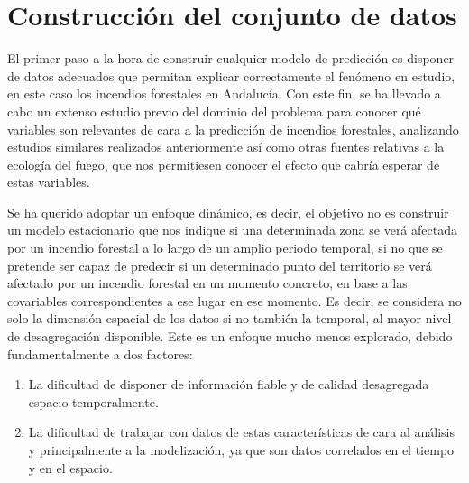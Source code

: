 \documentclass[12pt,a4paper,]{book}
\title{}
\author{Nombre Completo Autor}
\date{18/11/2021}
\def\ifdoblecara{} %
\def\ifprincipal{} %
\let\ifprincipal\undefined %
\providecommand{\tightlist}{%
  \setlength{\itemsep}{0pt}\setlength{\parskip}{0pt}}
\numberwithin{dummy}{section}
\theoremstyle{ocrenumbox}
\theoremstyle{blacknumex}
\theoremstyle{blacknumbox}
\theoremstyle{ocrenum}
\theoremstyle{ocrenum}
\begin{document}




\raggedbottom

\ifdefined\ifprincipal
\else
\setlength{\parindent}{1em}
\pagestyle{fancy}
\setcounter{tocdepth}{4}
\tableofcontents

\fi

\ifdefined\ifdoblecara
\fancyhead{}{}
\fancyhead[LE,RO]{\scriptsize\rightmark}
\fancyfoot[LO,RE]{\scriptsize\slshape \leftmark}
\fancyfoot[C]{}
\fancyfoot[LE,RO]{\footnotesize\thepage}
\else
\fancyhead{}{}
\fancyhead[RO]{\scriptsize\rightmark}
\fancyfoot[LO]{\scriptsize\slshape \leftmark}
\fancyfoot[C]{}
\fancyfoot[RO]{\footnotesize\thepage}
\fi

\renewcommand{\headrulewidth}{0.4pt}
\renewcommand{\footrulewidth}{0.4pt}

\hypertarget{construcciuxf3n-del-conjunto-de-datos}{%
\chapter{Construcción del conjunto de
datos}\label{construcciuxf3n-del-conjunto-de-datos}}

El primer paso a la hora de construir cualquier modelo de predicción es
disponer de datos adecuados que permitan explicar correctamente el
fenómeno en estudio, en este caso los incendios forestales en Andalucía.
Con este fin, se ha llevado a cabo un extenso estudio previo del dominio
del problema para conocer qué variables son relevantes de cara a la
predicción de incendios forestales, analizando estudios similares
realizados anteriormente así como otras fuentes relativas a la ecología
del fuego, que nos permitiesen conocer el efecto que cabría esperar de
estas variables.

Se ha querido adoptar un enfoque dinámico, es decir, el objetivo no es
construir un modelo estacionario que nos indique si una determinada zona
se verá afectada por un incendio forestal a lo largo de un amplio
periodo temporal, si no que se pretende ser capaz de predecir si un
determinado punto del territorio se verá afectado por un incendio
forestal en un momento concreto, en base a las covariables
correspondientes a ese lugar en ese momento. Es decir, se considera no
solo la dimensión espacial de los datos si no también la temporal, al
mayor nivel de desagregación disponible. Este es un enfoque mucho menos
explorado, debido fundamentalmente a dos factores:

\begin{enumerate}
\def\labelenumi{\arabic{enumi}.}
\tightlist
\item
  La dificultad de disponer de información fiable y de calidad
  desagregada espacio-temporalmente.
\item
  La dificultad de trabajar con datos de estas características de cara
  al análisis y principalmente a la modelización, ya que son datos
  correlados en el tiempo y en el espacio.
\end{enumerate}
\end{document}
